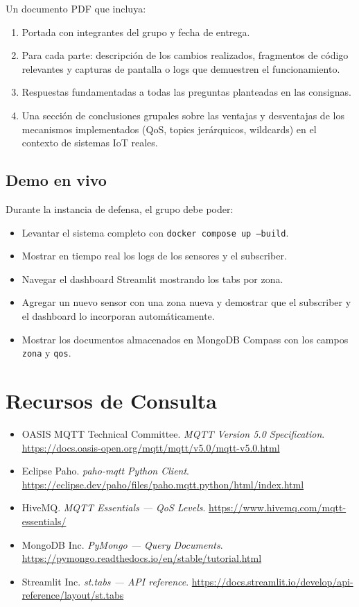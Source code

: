 \documentclass[12pt,a4paper]{article}
\begin{document}
Un documento PDF que incluya:
\begin{enumerate}
  \item Portada con integrantes del grupo y fecha de entrega.
  \item Para cada parte: descripción de los cambios realizados, fragmentos
        de código relevantes y capturas de pantalla o logs que demuestren
        el funcionamiento.
  \item Respuestas fundamentadas a todas las preguntas planteadas en las
        consignas.
  \item Una sección de conclusiones grupales sobre las ventajas y desventajas
        de los mecanismos implementados (QoS, topics jerárquicos, wildcards)
        en el contexto de sistemas IoT reales.
\end{enumerate}

\subsection{Demo en vivo}

Durante la instancia de defensa, el grupo debe poder:
\begin{itemize}
  \item Levantar el sistema completo con \texttt{docker compose up --build}.
  \item Mostrar en tiempo real los logs de los sensores y el subscriber.
  \item Navegar el dashboard Streamlit mostrando los tabs por zona.
  \item Agregar un nuevo sensor con una zona nueva y demostrar que el
        subscriber y el dashboard lo incorporan automáticamente.
  \item Mostrar los documentos almacenados en MongoDB Compass con los
        campos \texttt{zona} y \texttt{qos}.
\end{itemize}

\section{Recursos de Consulta}

\begin{itemize}
  \item OASIS MQTT Technical Committee. \textit{MQTT Version 5.0 Specification}.
        \url{https://docs.oasis-open.org/mqtt/mqtt/v5.0/mqtt-v5.0.html}
  \item Eclipse Paho. \textit{paho-mqtt Python Client}.
        \url{https://eclipse.dev/paho/files/paho.mqtt.python/html/index.html}
  \item HiveMQ. \textit{MQTT Essentials — QoS Levels}.
        \url{https://www.hivemq.com/mqtt-essentials/}
  \item MongoDB Inc. \textit{PyMongo — Query Documents}.
        \url{https://pymongo.readthedocs.io/en/stable/tutorial.html}
  \item Streamlit Inc. \textit{st.tabs — API reference}.
        \url{https://docs.streamlit.io/develop/api-reference/layout/st.tabs}
\end{itemize}
\end{document}
